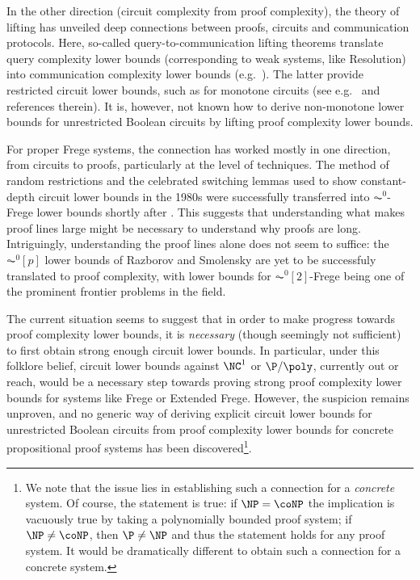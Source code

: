 \documentclass[11pt]{article}
\theoremstyle{definition}
\theoremstyle{plain}
\theoremstyle{remark}
\begin{document}
In the other direction (circuit complexity from proof complexity), the theory of lifting has unveiled deep connections between proofs, circuits and communication protocols. Here, so-called query-to-communication lifting theorems translate query complexity lower bounds (corresponding to weak systems, like Resolution) into communication complexity lower bounds (e.g.\ \cite{RMK97, LMMPZ22}). The latter provide restricted circuit lower bounds, such as for monotone circuits (see e.g.\ \cite{GGKS18, dRMNPRV20, dRGR22} and references therein). It is, however, not known how to derive non-monotone lower bounds for unrestricted Boolean circuits by lifting proof complexity lower bounds.

For proper Frege systems, the connection has worked mostly in one direction, from circuits to proofs, particularly at the level of techniques. The method of random restrictions and the celebrated switching lemmas used to show constant-depth circuit lower bounds in the 1980s \cite{FSS-AC0, Ajt83, Has86} were successfully transferred into $\AC^0$-Frege lower bounds shortly after \cite{Ajt94-PHP, BPU92-PHP,  Kra94-PHP,  jointPHP, PBI93, KPW95-AC0}. This suggests that understanding what makes proof lines large might be necessary to understand why proofs are long. Intriguingly, understanding the proof lines alone does not seem to suffice: the $\AC^0[p]$ lower bounds of Razborov and Smolensky \cite{Razb87, Smo87} are yet to be successfuly translated to proof complexity, with lower bounds for $\AC^0[2]$-Frege being one of the prominent frontier problems in the field.

The current situation seems to suggest that in order to make progress towards proof complexity lower bounds, it is \emph{necessary} (though seemingly not sufficient) to first obtain strong enough circuit lower bounds. In particular, under this folklore belief, circuit lower bounds against $\NC^1$ or $\P/\poly$, currently out or reach, would be a necessary step towards proving strong proof complexity lower bounds for systems like Frege or Extended Frege. However, the suspicion remains unproven, and no generic way of deriving explicit circuit lower bounds for unrestricted Boolean circuits from proof complexity lower bounds for concrete propositional proof systems has been discovered\footnote{We note that the issue lies in establishing such a connection for a \emph{concrete} system. Of course, the statement  is true: if $\NP = \coNP$ the implication is vacuously true by taking a polynomially bounded proof system; if $\NP \neq \coNP$, then $\P \neq \NP$ and thus the statement holds for any proof system. It would be dramatically different to obtain such a connection for a concrete system.}.
\end{document}
